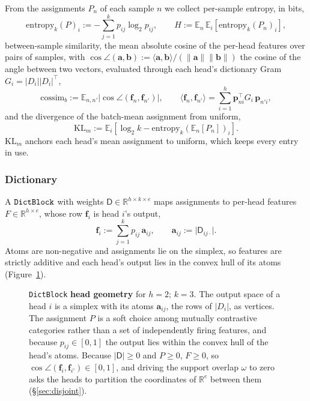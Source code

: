 From the assignments $P_n$ of each sample $n$ we collect per-sample
entropy, in bits,
\begin{equation}
	\mathrm{entropy}_k(P)_i :=
	-\sum^{k}_{j=1}p_{ij}\log_2 p_{ij},
	\qquad
	H := \mathbb{E}_{n}\,\mathbb{E}_{i}\!\left[
	\mathrm{entropy}_k(P_n)_i\right],
	\label{eq:entropy}
\end{equation}
between-sample similarity, the mean absolute cosine of the per-head
features over pairs of samples, with
$\cos\angle(\mathbf{a}, \mathbf{b}) :=
\langle\mathbf{a},\mathbf{b}\rangle / (\lVert\mathbf{a}\rVert\lVert\mathbf{b}\rVert)$
the cosine of the angle between two vectors, evaluated through each
head's dictionary Gram $G_i = \lvert D_{i}\rvert \lvert D_{i}\rvert^{\top}$,
\begin{equation}
	\mathrm{cossim}_b :=
	\mathbb{E}_{n,n'}\big\lvert
	\cos\angle(\mathbf{f}_{n}, \mathbf{f}_{n'})
	\big\rvert,
	\qquad
	\langle \mathbf{f}_{n}, \mathbf{f}_{n'}\rangle
	= \sum^{h}_{i=1}\mathbf{p}_{ni}^{\top}G_{i}\,\mathbf{p}_{n'i},
	\label{eq:cossim_b}
\end{equation}
and the divergence of the batch-mean assignment from uniform,
\begin{equation}
	\mathrm{KL}_m := \mathbb{E}_{i}\!\left[\log_2 k -
	\mathrm{entropy}_k\!\left(\mathbb{E}_n[P_n]\right)_i\right].
	\label{eq:KL}
\end{equation}
$\mathrm{KL}_m$ anchors each head's mean assignment to uniform, which
keeps every entry in use.

\subsubsection{Dictionary}
\label{sec:dict}
A $\mathop{\mathtt{DictBlock}}\limits$ with weights $\mathsf{D} \in \mathbb{R}^{h \times k \times e}$
maps assignments to per-head features $F \in \mathbb{R}^{h \times e}$,
whose row $\mathbf{f}_i$ is head $i$'s output,
\begin{equation}
	\mathbf{f}_i :=
	\sum^{k}_{j=1} p_{ij}\,\mathbf{a}_{ij},
	\qquad
	\mathbf{a}_{ij} := \lvert \mathsf{D}_{ij\cdot}\rvert .
	\label{eq:dictblock}
\end{equation}
Atoms are non-negative and assignments lie on the simplex, so features
are strictly additive and each head's output lies in the convex hull of
its atoms (Figure~\ref{fig:head-simplex}).

\begin{figure}[tp]
\centering

\caption[Per-head geometry]{\texttt{DictBlock} \textbf{head geometry} for $h{=}2$; $k{=}3$.
	The output space of a head $i$ is a simplex with its atoms
	$\mathbf{a}_{ij}$, the rows of $\lvert D_i\rvert$, as vertices. The assignment $P$ is a soft
	choice among mutually contrastive categories rather than a set of
	independently firing features, and because $p_{ij} \in [0,1]$ the
	output lies within the convex hull of the head's atoms.
	Because $\lvert \mathsf{D}\rvert\geq0$ and $P\geq0$, $F\geq0$, so
	$\cos\angle(\mathbf{f}_i, \mathbf{f}_{i'}) \in [0,1]$, and driving the support overlap $\omega$
	to zero asks the heads to partition the coordinates of $\mathbb{R}^e$
	between them (§\ref{sec:disjoint}).
}
\label{fig:head-simplex}
\end{figure}

